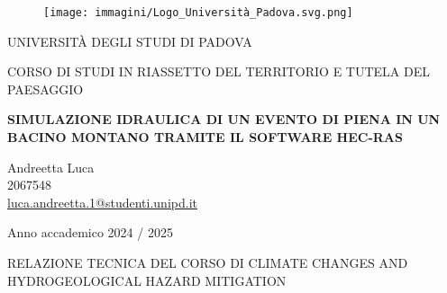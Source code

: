 \begin{figure}[H]\centering
    \texttt{[image: immagini/Logo\_Università\_Padova.svg.png]}
\end{figure}
\begin{center}

{\Large UNIVERSITÀ DEGLI STUDI DI PADOVA }\\
  \vspace{0.4 cm}
  
{\Large CORSO DI STUDI IN RIASSETTO DEL TERRITORIO E TUTELA DEL PAESAGGIO } \\ 
    \vspace{0.4 cm}
    
    \vspace{1 cm}

{\huge \textbf{SIMULAZIONE IDRAULICA DI UN EVENTO DI PIENA IN UN BACINO MONTANO TRAMITE IL SOFTWARE HEC-RAS} }
\vspace{0.75 cm}

\normalsize
\end{center}

{\Large \begin{center}
Andreetta Luca \\
2067548 \\
\href{mailto:luca.andreetta.1@studenti.unipd.it}{luca.andreetta.1@studenti.unipd.it}
\end{center}
\vspace{1 cm}

\thispagestyle{empty}
\begin{center}
	Anno accademico 2024 / 2025
\end{center}

\vspace{2 cm}
\begin{center}
    RELAZIONE TECNICA DEL CORSO DI CLIMATE CHANGES AND HYDROGEOLOGICAL HAZARD MITIGATION 
\end{center}
}

\newpage